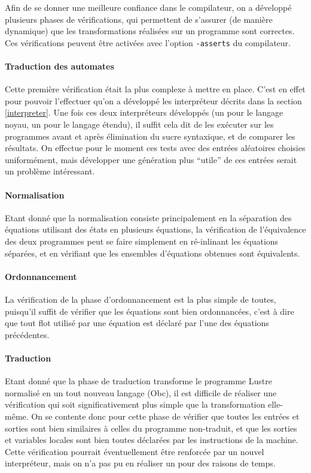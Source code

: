 \documentclass{article}
\begin{document}
Afin de se donner une meilleure confiance dans le compilateur, on a développé plusieurs phases de vérifications, qui permettent de s'assurer (de manière dynamique) que les transformations réalisées sur un programme sont correctes. Ces vérifications peuvent être activées avec l'option \texttt{-asserts} du compilateur.

\paragraph{Traduction des automates}
Cette première vérification était la plus complexe à mettre en place. C'est en effet pour pouvoir l'effectuer qu'on a développé les interpréteur décrits dans la section \ref{interpreter}. Une fois ces deux interpréteurs développés (un pour le langage noyau, un pour le langage étendu), il suffit cela dit de les exécuter sur les programmes avant et après élimination du sucre syntaxique, et de comparer les résultats. On effectue pour le moment ces tests avec des entrées aléatoires choisies uniformément, mais développer une génération plus ``utile'' de ces entrées serait un problème intéressant.

\paragraph{Normalisation}
Etant donné que la normalisation consiste principalement en la séparation des équations utilisant des états en plusieurs équations, la vérification de l'équivalence des deux programmes peut se faire simplement en ré-inlinant les équations séparées, et en vérifiant que les ensembles d'équations obtenues sont équivalents.

\paragraph{Ordonnancement}
La vérification de la phase d'ordonnancement est la plus simple de toutes, puisqu'il suffit de vérifier que les équations sont bien ordonnancées, c'est à dire que tout flot utilisé par une équation est déclaré par l'une des équations précédentes.

\paragraph{Traduction} Etant donné que la phase de traduction transforme le programme Lustre normalisé en un tout nouveau langage (Obc), il est difficile de réaliser une vérification qui soit significativement plus simple que la transformation elle-même. On se contente donc pour cette phase de vérifier que toutes les entrées et sorties sont bien similaires à celles du programme non-traduit, et que les sorties et variables locales sont bien toutes déclarées par les instructions de la machine. Cette vérification pourrait éventuellement être renforcée par un nouvel interpréteur, mais on n'a pas pu en réaliser un pour des raisons de temps.
\end{document}
